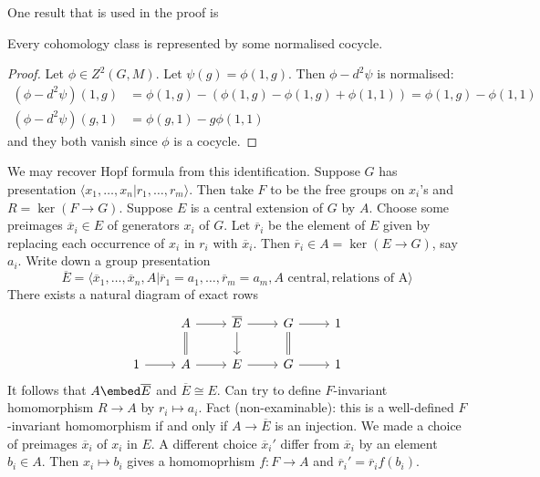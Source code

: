 \documentclass[a4paper]{article}
\begin{document}
One result that is used in the proof is

\begin{lemma}
  Every cohomology class is represented by some normalised cocycle.
\end{lemma}

\begin{proof}
  Let \(\phi \in Z^2(G, M)\). Let \(\psi(g) = \phi(1, g)\). Then \(\phi - d^2\psi\) is normalised:
  \begin{align*}
    (\phi - d^2\psi)(1, g)
    &= \phi(1, g) - (\phi(1, g) - \phi(1, g) + \phi(1, 1))
      = \phi(1, g) - \phi(1, 1) \\
    (\phi - d^2\psi)(g, 1)
    &= \phi(g, 1) - g \phi(1, 1)
  \end{align*}
  and they both vanish since \(\phi\) is a cocycle.
\end{proof}

We may recover Hopf formula from this identification. Suppose \(G\) has presentation \(\langle x_1, \dots, x_n | r_1, \dots, r_m \rangle\). Then take \(F\) to be the free groups on \(x_i\)'s and \(R = \ker (F \to G)\). Suppose \(E\) is a central extension of \(G\) by \(A\). Choose some preimages \(\overline x_i \in E\) of generators \(x_i\) of \(G\). Let \(\overline r_i\) be the element of \(E\) given by replacing each occurrence of \(x_i\) in \(r_i\) with \(\overline x_i\). Then \(\overline r_i \in A = \ker (E \to G)\), say \(a_i\). Write down a group presentation
\[
  \overline E = \langle \overline x_1, \dots, \overline x_n, A | \overline r_1 = a_1, \dots, \overline r_m = a_m, A \text{ central}, \text{relations of A}\rangle
\]
There exists a natural diagram of exact rows
\[
  \begin{tikzcd}
    & A \ar[r] \ar[d, equal] & \overline E \ar[r] \ar[d] & G \ar[r] \ar[d, equal] & 1 \\
    1 \ar[r] & A \ar[r] & E \ar[r] & G \ar[r] & 1
  \end{tikzcd}
\]
It follows that \(A \embed \overline E\) and \(\overline E \cong E\). Can try to define \(F\)-invariant homomorphism \(R \to A\) by \(r_i \mapsto a_i\). Fact (non-examinable): this is a well-defined \(F\)-invariant homomorphism if and only if \(A \to \overline E\) is an injection. We made a choice of preimages \(\overline x_i\) of \(x_i\) in \(E\). A different choice \(\overline x_i'\) differ from \(\overline x_i\) by an element \(b_i \in A\). Then \(x_i \mapsto b_i\) gives a homomoprhism \(f: F \to A\) and \(\overline r_i' = \overline r_i f(b_i)\).
\end{document}

